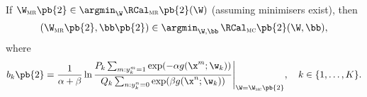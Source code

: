 \begin{theorem}
\label{theorem:mr2mc2}
If $\W_\textsc{mr}\pb{2} \in \argmin_\W \RCal_\textsc{mr}\pb{2}(\W)$ (assuming minimisers exist),
then 
$$
(\W_\textsc{mr}\pb{2}, \bb\pb{2}) \in \argmin_{\W,\bb} \, \RCal_\textsc{mc}\pb{2}(\W, \bb),
$$ 
where
$$
b_k\pb{2}
= \frac{1}{\alpha + \beta}
  \ln \frac{P_k \sum_{m: y_k^m = 1} \exp(-\alpha g(\x^m; \w_k))} {Q_k \sum_{n: y_k^n = 0} \exp( \beta g(\x^n; \w_k))}
  \Bigg|_{\W = \W_\textsc{mc}\pb{2}},
  \quad k \in \{1,\dots,K\}.
$$
\end{theorem}
